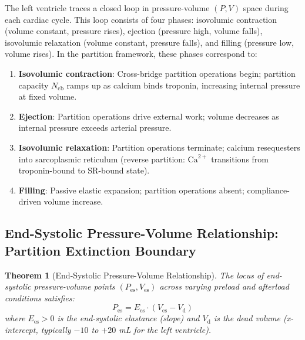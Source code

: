 \documentclass[10pt,twocolumn,a4paper]{article}
\newtheorem{theorem}{Theorem}[section]
\theoremstyle{remark}
\newcommand{\Ees}{E_{\mathrm{es}}}
\newcommand{\Vd}{V_{\mathrm{d}}}
\newcommand{\Pes}{P_{\mathrm{es}}}
\newcommand{\Ncb}{N_{\mathrm{cb}}}
\begin{document}
The left ventricle traces a closed loop in pressure-volume $(P, V)$ space during each cardiac cycle. This loop consists of four phases: isovolumic contraction (volume constant, pressure rises), ejection (pressure high, volume falls), isovolumic relaxation (volume constant, pressure falls), and filling (pressure low, volume rises). In the partition framework, these phases correspond to:

\begin{enumerate}[label=(\roman*)]
    \item \textbf{Isovolumic contraction}: Cross-bridge partition operations begin; partition capacity $\Ncb$ ramps up as calcium binds troponin, increasing internal pressure at fixed volume.
    \item \textbf{Ejection}: Partition operations drive external work; volume decreases as internal pressure exceeds arterial pressure.
    \item \textbf{Isovolumic relaxation}: Partition operations terminate; calcium resequesters into sarcoplasmic reticulum (reverse partition: $\text{Ca}^{2+}$ transitions from troponin-bound to SR-bound state).
    \item \textbf{Filling}: Passive elastic expansion; partition operations absent; compliance-driven volume increase.
\end{enumerate}

\subsection{End-Systolic Pressure-Volume Relationship: Partition Extinction Boundary}

\begin{theorem}[End-Systolic Pressure-Volume Relationship]
\label{thm:espvr}
    The locus of end-systolic pressure-volume points $(P_{\mathrm{es}}, V_{\mathrm{es}})$ across varying preload and afterload conditions satisfies:
    \begin{equation}
        \boxed{\Pes = \Ees \cdot (V_{\mathrm{es}} - \Vd)}
        \label{eq:espvr}
    \end{equation}
    where $\Ees > 0$ is the end-systolic elastance (slope) and $\Vd$ is the dead volume (x-intercept, typically $-10$ to $+20$ mL for the left ventricle).
\end{theorem}
\end{document}
